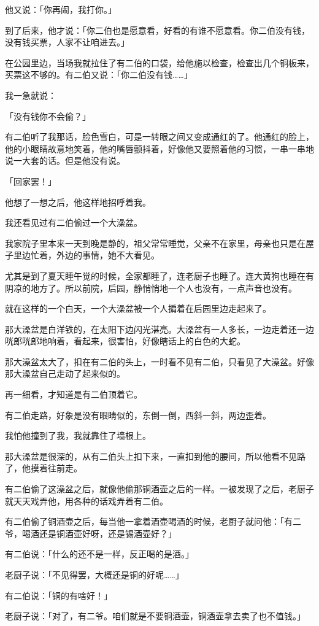 \documentclass[UTF8]{ctexart}
\begin{document}
他又说：「你再闹，我打你。」

到了后来，他才说：「你二伯也是愿意看，好看的有谁不愿意看。你二伯没有钱，没有钱买票，人家不让咱进去。」

在公园里边，当场我就拉住了有二伯的口袋，给他施以检查，检查出几个铜板来，买票这不够的。有二伯又说：「你二伯没有钱……」

我一急就说：

「没有钱你不会偷？」

有二伯听了我那话，脸色雪白，可是一转眼之间又变成通红的了。他通红的脸上，他的小眼睛故意地笑着，他的嘴唇颤抖着，好像他又要照着他的习惯，一串一串地说一大套的话。但是他没有说。

「回家罢！」

他想了一想之后，他这样地招呼着我。

我还看见过有二伯偷过一个大澡盆。

我家院子里本来一天到晚是静的，祖父常常睡觉，父亲不在家里，母亲也只是在屋子里边忙着，外边的事情，她不大看见。

尤其是到了夏天睡午觉的时候，全家都睡了，连老厨子也睡了。连大黄狗也睡在有阴凉的地方了。所以前院，后园，静悄悄地一个人也没有，一点声音也没有。

就在这样的一个白天，一个大澡盆被一个人掮着在后园里边走起来了。

那大澡盆是白洋铁的，在太阳下边闪光湛亮。大澡盆有一人多长，一边走着还一边咣郎咣郎地响着，看起来，很害怕，好像瞎话上的白色的大蛇。

那大澡盆太大了，扣在有二伯的头上，一时看不见有二伯，只看见了大澡盆。好像那大澡盆自己走动了起来似的。

再一细看，才知道是有二伯顶着它。

有二伯走路，好象是没有眼睛似的，东倒一倒，西斜一斜，两边歪着。

我怕他撞到了我，我就靠住了墙根上。

那大澡盆是很深的，从有二伯头上扣下来，一直扣到他的腰间，所以他看不见路了，他摸着往前走。

有二伯偷了这澡盆之后，就像他偷那铜酒壶之后的一样。一被发现了之后，老厨子就天天戏弄他，用各种的话戏弄着有二伯。

有二伯偷了铜酒壶之后，每当他一拿着酒壶喝酒的时候，老厨子就问他：「有二爷，喝酒还是铜酒壶好呀，还是锡酒壶好？」

有二伯说：「什么的还不是一样，反正喝的是酒。」

老厨子说：「不见得罢，大概还是铜的好呢……」

有二伯说：「铜的有啥好！」

老厨子说：「对了，有二爷。咱们就是不要铜酒壶，铜酒壶拿去卖了也不值钱。」
\end{document}
